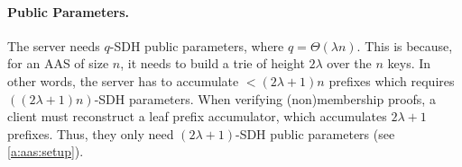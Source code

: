 \paragraph{Public Parameters.}
The server needs $q$-SDH public parameters, where $q = \Theta(\lambda n)$.
This is because, for an AAS of size $n$, it needs to build a trie of height $2\lambda$ over the $n$ keys.
In other words, the server has to accumulate $< (2\lambda+1) n$ prefixes which requires $((2\lambda +1) n)$-SDH parameters.
When verifying (non)membership proofs, a client must reconstruct a leaf prefix accumulator, which accumulates $2\lambda+1$ prefixes.
Thus, they only need $(2\lambda+1)$-SDH public parameters (see \cref{a:aas:setup}).
